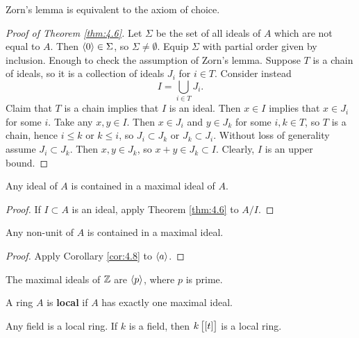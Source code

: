 Zorn's lemma is equivalent to the axiom of choice.

\begin{proof}[Proof of Theorem \ref{thm:4.6}]
Let $ \Sigma $ be the set of all ideals of $ A $ which are not equal to $ A $. Then $ \left\langle 0 \right\rangle \in \Sigma $, so $ \Sigma \ne \emptyset $. Equip $ \Sigma $ with partial order given by inclusion. Enough to check the assumption of Zorn's lemma. Suppose $ T $ is a chain of ideals, so it is a collection of ideals $ J_i $ for $ i \in T $. Consider instead
$$ I = \bigcup_{i \in T} J_i. $$
Claim that $ T $ is a chain implies that $ I $ is an ideal. Then $ x \in I $ implies that $ x \in J_i $ for some $ i $. Take any $ x, y \in I $. Then $ x \in J_i $ and $ y \in J_k $ for some $ i, k \in T $, so $ T $ is a chain, hence $ i \le k $ or $ k \le i $, so $ J_i \subset J_k $ or $ J_k \subset J_i $. Without loss of generality assume $ J_i \subset J_k $. Then $ x, y \in J_k $, so $ x + y \in J_k \subset I $. Clearly, $ I $ is an upper bound.
\end{proof}

\pagebreak

\begin{corollary}
\label{cor:4.8}
Any ideal of $ A $ is contained in a maximal ideal of $ A $.
\end{corollary}

\begin{proof}
If $ I \subset A $ is an ideal, apply Theorem \ref{thm:4.6} to $ A / I $.
\end{proof}

\begin{corollary}
\label{cor:4.9}
Any non-unit of $ A $ is contained in a maximal ideal.
\end{corollary}

\begin{proof}
Apply Corollary \ref{cor:4.8} to $ \left\langle a \right\rangle $.
\end{proof}

\begin{example*}
The maximal ideals of $ \mathbb{Z} $ are $ \left\langle p \right\rangle $, where $ p $ is prime.
\end{example*}

\begin{definition}
A ring $ A $ is \textbf{local} if $ A $ has exactly one maximal ideal.
\end{definition}

\begin{example*}
Any field is a local ring. If $ k $ is a field, then $ k\sbr{\sbr{t}} $ is a local ring.
\end{example*}

